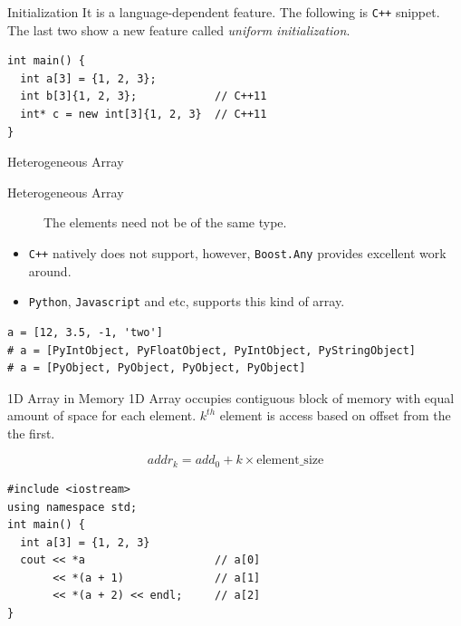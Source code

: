 \documentclass[presentation]{beamer}
\begin{document}
\begin{frame}[fragile,label={sec:orgheadline28}]{Initialization}
 It is a language-dependent feature.  The following is \texttt{C++}
snippet.  The last two show a new feature called \emph{uniform
initialization}.

\begin{verbatim}
int main() {
  int a[3] = {1, 2, 3};
  int b[3]{1, 2, 3};            // C++11
  int* c = new int[3]{1, 2, 3}  // C++11
}
\end{verbatim}
\end{frame}

\begin{frame}[fragile,label={sec:orgheadline29}]{Heterogeneous Array}
 \begin{description}
\item[{Heterogeneous Array}] The elements need not be of the same type.
\end{description}


\begin{itemize}
\item \texttt{C++} natively does not support, however, \texttt{Boost.Any} provides
excellent work around.
\item \texttt{Python}, \texttt{Javascript} and etc, supports this kind of array.
\end{itemize}


\begin{verbatim}
a = [12, 3.5, -1, 'two']
# a = [PyIntObject, PyFloatObject, PyIntObject, PyStringObject]
# a = [PyObject, PyObject, PyObject, PyObject]
\end{verbatim}
\end{frame}

\begin{frame}[fragile,label={sec:orgheadline30}]{1D Array in Memory}
 1D Array occupies contiguous block of memory with equal amount of
space for each element.  \(k^{th}\) element is access based on
offset from the the first.

\[
   addr_k = add_0 + k\times \text{element\_size}
   \]

\begin{verbatim}
#include <iostream>
using namespace std;
int main() {
  int a[3] = {1, 2, 3}
  cout << *a                    // a[0]
       << *(a + 1)              // a[1]
       << *(a + 2) << endl;     // a[2]
}
\end{verbatim}
\end{frame}
\end{document}
